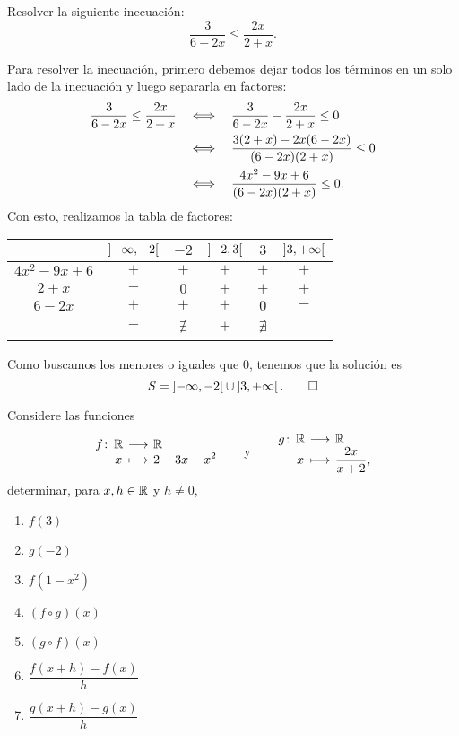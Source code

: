 \documentclass[10pt,respuestas,a4]{aleph-examen}
\begin{document}
\begin{preguntas}
\item
    Resolver la siguiente inecuación:
    \[
        \frac{3}{6-2x}\leq \frac{2x}{2+x}.
    \]

\begin{respuesta}
    Para resolver la inecuación, primero debemos dejar todos los términos en un solo lado de la inecuación y luego separarla en factores:
    \begin{align*}
       \frac{3}{6-2x}\leq \frac{2x}{2+x}
       &\quad\Longleftrightarrow\quad \frac{3}{6-2x} - \frac{2x}{2+x} \leq 0 \\
       &\quad\Longleftrightarrow\quad \frac{3(2+x)-2x(6-2x)}{(6-2x)(2+x)} \leq 0\\
       &\quad\Longleftrightarrow\quad \frac{4 x^2 - 9 x + 6}{(6-2x)(2+x)} \leq 0.
    \end{align*}
    Con esto, realizamos la tabla de factores:
    \begin{center}\small
    \begin{tabular}{c|c|c|c|c|c}
        & $\left]-\infty,-2\right[$ & $-2$ & $\left]-2,3\right[$ & $3$ &$\left]3,+\infty\right[$\\
        \hline
        $4 x^2 - 9 x + 6$ & $+$ & $+$ & $+$ & $+$ & $+$\\
        $2 +x$ & $-$ & $0$ & $+$ & $+$ & $+$\\
        $6-2x$ & $+$ & $+$ & $+$ & $0$ & $-$\\
        \hline
        & $-$ & $\nexists$ & $+$  & $\nexists$ & -
    \end{tabular}
    \end{center}
    Como buscamos los menores o iguales que $0$, tenemos que la solución es
    \[
        S = \left]-\infty,-2\right[ \cup \left]3,+\infty \right[.
        \qedhere
    \]
\end{respuesta}

\item
    Considere las funciones
    \[
        \funcion{f}{\R}{\R}{x}{2 - 3x - x^2}
        \texty
        \funcion{g}{\R}{\R}{x}{\frac{2x}{x + 2},}
    \]
    determinar, para $x,h\in\mathbb{R}$ y $h\neq 0$,
    \begin{multicols}{2}
        \begin{enumerate}[label=\textit{\alph*)}]
        \item 
            $f(3)$
        \item
            $g(-2)$
        \item
            $f(1-x^2)$
        \item
            $(f\circ g)(x)$
        \item
            $(g\circ f)(x)$
        \item
            $\dfrac{f(x+h)-f(x)}{h}$
        \item
            $\dfrac{g(x+h)-g(x)}{h}$
        \end{enumerate}    
    \end{multicols}
    

\end{preguntas}
\end{document}
